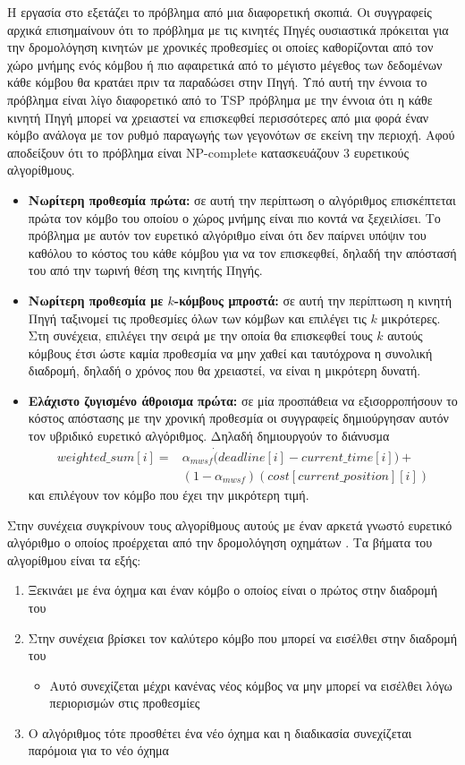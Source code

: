Η εργασία στο \cite{dynamic_deadlines} εξετάζει το πρόβλημα από μια διαφορετική σκοπιά. Οι συγγραφείς αρχικά επισημαίνουν ότι το πρόβλημα με τις κινητές Πηγές
ουσιαστικά πρόκειται για την δρομολόγηση κινητών με χρονικές προθεσμίες οι οποίες καθορίζονται από τον χώρο μνήμης ενός κόμβου ή πιο αφαιρετικά από το μέγιστο μέγεθος
των δεδομένων κάθε κόμβου θα κρατάει πριν τα παραδώσει στην Πηγή. Υπό αυτή την έννοια το πρόβλημα είναι λίγο διαφορετικό από το TSP πρόβλημα με την έννοια ότι η κάθε
κινητή Πηγή μπορεί να χρειαστεί να επισκεφθεί περισσότερες από μια φορά έναν κόμβο ανάλογα με τον ρυθμό παραγωγής των γεγονότων σε εκείνη την περιοχή. Αφού
αποδείξουν ότι το πρόβλημα είναι NP-complete κατασκευάζουν 3 ευρετικούς αλγορίθμους.
\begin{itemize}
\item \textbf{Νωρίτερη προθεσμία πρώτα:} σε αυτή την περίπτωση ο αλγόριθμος επισκέπτεται πρώτα τον κόμβο του οποίου ο χώρος μνήμης είναι πιο κοντά να ξεχειλίσει. Το
πρόβλημα με αυτόν τον ευρετικό αλγόριθμο είναι ότι δεν παίρνει υπόψιν του καθόλου το κόστος του κάθε κόμβου για να τον επισκεφθεί, δηλαδή την απόστασή του από την
τωρινή θέση της κινητής Πηγής.
\item \textbf{Νωρίτερη προθεσμία με $k$-κόμβους μπροστά:} σε αυτή την περίπτωση η κινητή Πηγή ταξινομεί τις προθεσμίες όλων των κόμβων και επιλέγει τις $k$
μικρότερες. Στη συνέχεια, επιλέγει την σειρά με την οποία θα επισκεφθεί τους $k$ αυτούς κόμβους έτσι ώστε καμία προθεσμία να μην χαθεί και ταυτόχρονα η συνολική
διαδρομή, δηλαδή ο χρόνος που θα χρειαστεί, να είναι η μικρότερη δυνατή.
\item \textbf{Ελάχιστο ζυγισμένο άθροισμα πρώτα:} σε μία προσπάθεια να εξισορροπήσουν το κόστος απόστασης με την χρονική προθεσμία οι συγγραφείς δημιούργησαν αυτόν
τον υβριδικό ευρετικό αλγόριθμος. Δηλαδή δημιουργούν το διάνυσμα
\begin{align*}
weighted\_sum[i] = & \alpha_{mwsf}\dot (deadline[i]-current\_time[i]) +\\
& (1-\alpha_{mwsf})(cost[current\_position][i])
\end{align*} και επιλέγουν τον κόμβο που έχει την μικρότερη τιμή.
\end{itemize}
Στην συνέχεια συγκρίνουν τους αλγορίθμους αυτούς με έναν αρκετά γνωστό
ευρετικό αλγόριθμο ο οποίος προέρχεται από την δρομολόγηση οχημάτων \cite{vehicle_routing_windows}. Τα βήματα του αλγορίθμου είναι τα εξής:
\begin{enumerate}
\item Ξεκινάει με ένα όχημα και έναν κόμβο ο οποίος είναι ο πρώτος στην διαδρομή του
\item Στην συνέχεια βρίσκει τον καλύτερο κόμβο που μπορεί να εισέλθει στην διαδρομή του
\begin{itemize}
	\item Αυτό συνεχίζεται μέχρι κανένας νέος κόμβος να μην μπορεί να εισέλθει λόγω περιορισμών στις προθεσμίες
\end{itemize}
\item Ο αλγόριθμος τότε προσθέτει ένα νέο όχημα και η διαδικασία συνεχίζεται παρόμοια για το νέο όχημα
\end{enumerate}
